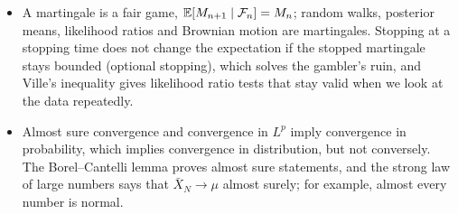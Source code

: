 \begin{itemize}[leftmargin=*]
    \item A martingale is a fair game, $\mathbb{E}[M_{n+1} \mid \mathcal{F}_n] = M_n$; random walks, posterior means, likelihood ratios and Brownian motion are martingales. Stopping at a stopping time does not change the expectation if the stopped martingale stays bounded (optional stopping), which solves the gambler's ruin, and Ville's inequality gives likelihood ratio tests that stay valid when we look at the data repeatedly.
    \item Almost sure convergence and convergence in $L^p$ imply convergence in probability, which implies convergence in distribution, but not conversely. The Borel--Cantelli lemma proves almost sure statements, and the strong law of large numbers says that $\bar X_N \to \mu$ almost surely; for example, almost every number is normal.
\end{itemize}

